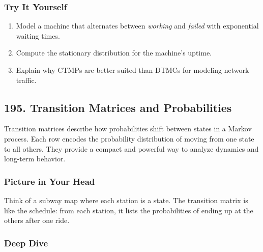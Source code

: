 \documentclass[
  letterpaper,
  DIV=11,
  numbers=noendperiod]{scrreprt}
\providecommand{\tightlist}{%
  \setlength{\itemsep}{0pt}\setlength{\parskip}{0pt}}
\begin{document}
\subsubsection{Try It Yourself}\label{try-it-yourself-193}

\begin{enumerate}
\def\labelenumi{\arabic{enumi}.}
\tightlist
\item
  Model a machine that alternates between \emph{working} and
  \emph{failed} with exponential waiting times.
\item
  Compute the stationary distribution for the machine's uptime.
\item
  Explain why CTMPs are better suited than DTMCs for modeling network
  traffic.
\end{enumerate}

\subsection{195. Transition Matrices and
Probabilities}\label{transition-matrices-and-probabilities}

Transition matrices describe how probabilities shift between states in a
Markov process. Each row encodes the probability distribution of moving
from one state to all others. They provide a compact and powerful way to
analyze dynamics and long-term behavior.

\subsubsection{Picture in Your Head}\label{picture-in-your-head-194}

Think of a subway map where each station is a state. The transition
matrix is like the schedule: from each station, it lists the
probabilities of ending up at the others after one ride.

\subsubsection{Deep Dive}\label{deep-dive-194}
\end{document}
